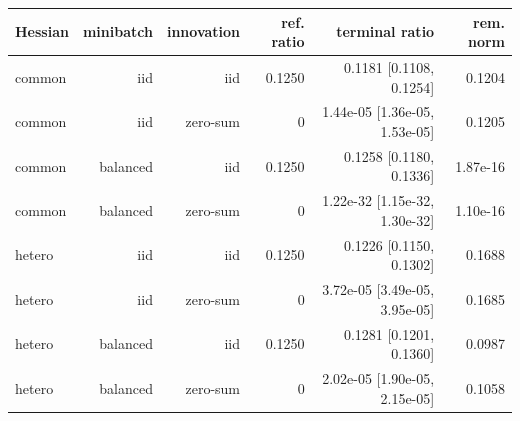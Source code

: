 \begin{tabular}{lrrrrr}
\toprule
Hessian & minibatch & innovation & ref. ratio & terminal ratio & rem. norm \\
\midrule
common & iid & iid & 0.1250 & 0.1181 [0.1108, 0.1254] & 0.1204 \\
common & iid & zero-sum & 0 & 1.44e-05 [1.36e-05, 1.53e-05] & 0.1205 \\
common & balanced & iid & 0.1250 & 0.1258 [0.1180, 0.1336] & 1.87e-16 \\
common & balanced & zero-sum & 0 & 1.22e-32 [1.15e-32, 1.30e-32] & 1.10e-16 \\
hetero & iid & iid & 0.1250 & 0.1226 [0.1150, 0.1302] & 0.1688 \\
hetero & iid & zero-sum & 0 & 3.72e-05 [3.49e-05, 3.95e-05] & 0.1685 \\
hetero & balanced & iid & 0.1250 & 0.1281 [0.1201, 0.1360] & 0.0987 \\
hetero & balanced & zero-sum & 0 & 2.02e-05 [1.90e-05, 2.15e-05] & 0.1058 \\
\bottomrule
\end{tabular}
